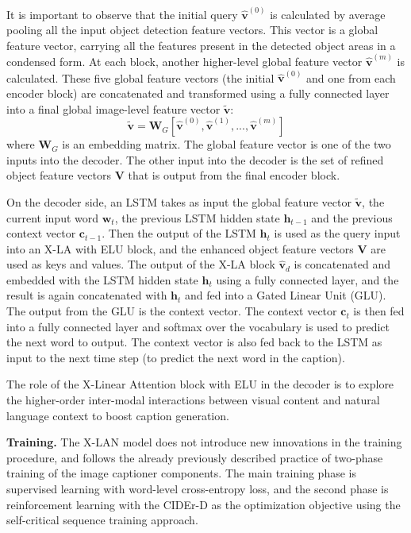 \documentclass[english,twoside,openright]{HYgraduMLDS}
\newcommand{\matr}[1]{\bm{#1}}
\newcommand{\vect}[1]{\bm{#1}}
\begin{document}
It is important to observe that the initial query $\hat{\vect{v}}^{(0)}$ is calculated by average pooling all the input object detection feature vectors. This vector is a global feature vector, carrying all the features present in the detected object areas in a condensed form. At each block, another higher-level global feature vector $\hat{\vect{v}}^{(m)}$ is calculated. These five global feature vectors (the initial $\hat{\vect{v}}^{(0)}$ and one from each encoder block) are concatenated and transformed using a fully connected layer into a final global image-level feature vector $\tilde{\vect{v}}$:
\begin{equation}
\tilde{\vect{v}} = \matr{W}_G [\hat{\vect{v}}^{(0)}, \hat{\vect{v}}^{(1)},\text{...},\hat{\vect{v}}^{(m)}]
\end{equation}
%
where $\matr{W}_G$ is an embedding matrix. The global feature vector is one of the two inputs into the decoder. The other input into the decoder is the set of refined object feature vectors $\matr{V}$ that is output from the final encoder block.

On the decoder side, an LSTM takes as input the global feature vector $\tilde{\vect{v}}$, the current input word $\vect{w}_t$, the previous LSTM hidden state $\vect{h}_{t-1}$ and the previous context vector $\vect{c}_{t-1}$. Then the output of the LSTM $\vect{h}_t$ is used as the query input into an X-LA with ELU block, and the enhanced object feature vectors $\matr{V}$ are used as keys and values. The output of the X-LA block $\hat{\vect{v}}_{d}$ is concatenated and embedded with the LSTM hidden state $\vect{h}_t$ using a fully connected layer, and the result is again concatenated with $\vect{h}_t$ and fed into a Gated Linear Unit (GLU). The output from the GLU is the context vector. The context vector $\vect{c}_{t}$ is then fed into a fully connected layer and softmax over the vocabulary is used to predict the next word to output. The context vector is also fed back to the LSTM as input to the next time step (to predict the next word in the caption).

The role of the  X-Linear Attention block with ELU in the decoder is to explore the higher-order inter-modal interactions between visual content and natural language context to boost caption generation. 

\textbf{Training.} The X-LAN model does not introduce new innovations in the training procedure, and follows the already previously described practice of two-phase training of the image captioner components. The main training phase is supervised learning with word-level cross-entropy loss, and the second phase is reinforcement learning with the CIDEr-D as the optimization objective using the self-critical sequence training approach.
\end{document}

